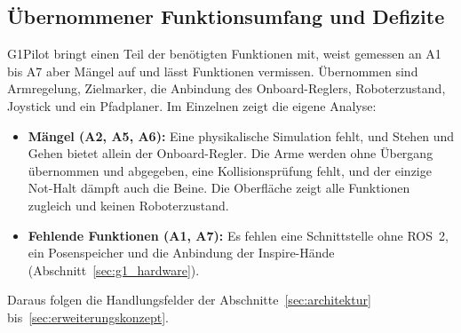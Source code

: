\subsection{Übernommener Funktionsumfang und Defizite}
\label{sec:defizite}
G1Pilot bringt einen Teil der benötigten Funktionen mit, weist gemessen an A1 bis A7 aber Mängel auf und lässt Funktionen vermissen.
Übernommen sind Armregelung, Zielmarker, die Anbindung des Onboard-Reglers, Roboterzustand, Joystick und ein Pfadplaner.
Im Einzelnen zeigt die eigene Analyse:
\begin{itemize}
  \item \textbf{Mängel (A2, A5, A6):} Eine physikalische Simulation fehlt, und Stehen und Gehen bietet allein der Onboard-Regler. Die Arme werden ohne Übergang übernommen und abgegeben, eine Kollisionsprüfung fehlt, und der einzige Not-Halt dämpft auch die Beine. Die Oberfläche zeigt alle Funktionen zugleich und keinen Roboterzustand.
  \item \textbf{Fehlende Funktionen (A1, A7):} Es fehlen eine Schnittstelle ohne ROS~2, ein Posenspeicher und die Anbindung der Inspire-Hände (Abschnitt~\ref{sec:g1_hardware}).
\end{itemize}
Daraus folgen die Handlungsfelder der Abschnitte~\ref{sec:architektur} bis~\ref{sec:erweiterungskonzept}.

